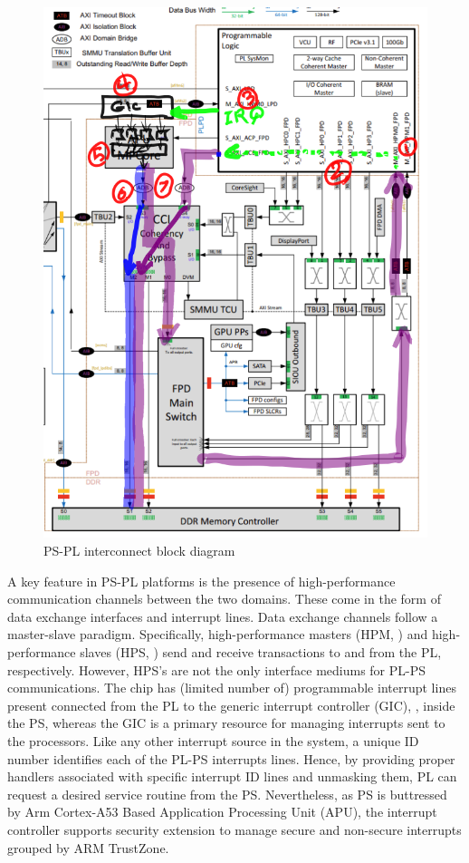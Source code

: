 \begin{figure}[ht!]
  \centering
  \includegraphics[scale=0.4]{images/ps-pl-interconnect.png}
  \caption{PS-PL interconnect block diagram}
  \label{fig:PS-PL-diagram}
\end{figure}

A key feature in PS-PL platforms is the presence of high-performance
communication channels between the two domains. These come in the form
of data exchange interfaces and interrupt lines. Data exchange
channels follow a master-slave paradigm. Specifically,
high-performance masters (HPM, ) and high-performance
slaves (HPS, )  send and receive transactions to and from
the PL, respectively. However, HPS's are not the only interface
mediums for PL-PS communications. The chip has (limited number of)
programmable interrupt lines  present connected from the PL
to the generic interrupt controller (GIC), , inside the PS,
whereas the GIC is a primary resource for managing interrupts sent to
the processors. Like any other interrupt source in the system, a
unique ID number identifies each of the PL-PS interrupts lines. Hence,
by providing proper handlers associated with specific interrupt ID
lines and unmasking them, PL can request a desired service routine
from the PS. Nevertheless, as PS is buttressed by Arm Cortex-A53 Based
Application Processing Unit (APU), the interrupt controller supports
security extension to manage secure and non-secure interrupts grouped
by ARM TrustZone.


